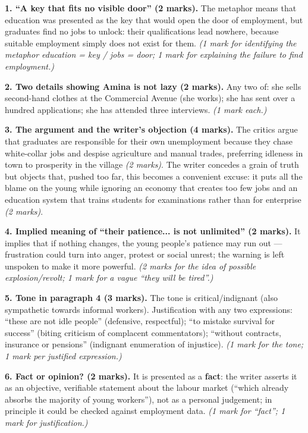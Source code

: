 \documentclass[11pt]{article}
\begin{document}
\begin{corrige}
\textbf{1. ``A key that fits no visible door'' (2 marks).} The metaphor means that education was presented as the key that would open the door of employment, but graduates find no jobs to unlock: their qualifications lead nowhere, because suitable employment simply does not exist for them. \emph{(1 mark for identifying the metaphor education = key / jobs = door; 1 mark for explaining the failure to find employment.)}

\textbf{2. Two details showing Amina is not lazy (2 marks).} Any two of: she sells second-hand clothes at the Commercial Avenue (she works); she has sent over a hundred applications; she has attended three interviews. \emph{(1 mark each.)}

\textbf{3. The argument and the writer's objection (4 marks).} The critics argue that graduates are responsible for their own unemployment because they chase white-collar jobs and despise agriculture and manual trades, preferring idleness in town to prosperity in the village \emph{(2 marks)}. The writer concedes a grain of truth but objects that, pushed too far, this becomes a convenient excuse: it puts all the blame on the young while ignoring an economy that creates too few jobs and an education system that trains students for examinations rather than for enterprise \emph{(2 marks)}.

\textbf{4. Implied meaning of ``their patience... is not unlimited'' (2 marks).} It implies that if nothing changes, the young people's patience may run out — frustration could turn into anger, protest or social unrest; the warning is left unspoken to make it more powerful. \emph{(2 marks for the idea of possible explosion/revolt; 1 mark for a vague ``they will be tired''.)}

\textbf{5. Tone in paragraph 4 (3 marks).} The tone is critical/indignant (also sympathetic towards informal workers). Justification with any two expressions: ``these are not idle people'' (defensive, respectful); ``to mistake survival for success'' (biting criticism of complacent commentators); ``without contracts, insurance or pensions'' (indignant enumeration of injustice). \emph{(1 mark for the tone; 1 mark per justified expression.)}

\textbf{6. Fact or opinion? (2 marks).} It is presented as a \textbf{fact}: the writer asserts it as an objective, verifiable statement about the labour market (``which already absorbs the majority of young workers''), not as a personal judgement; in principle it could be checked against employment data. \emph{(1 mark for ``fact''; 1 mark for justification.)}


\end{corrige}
\end{document}
